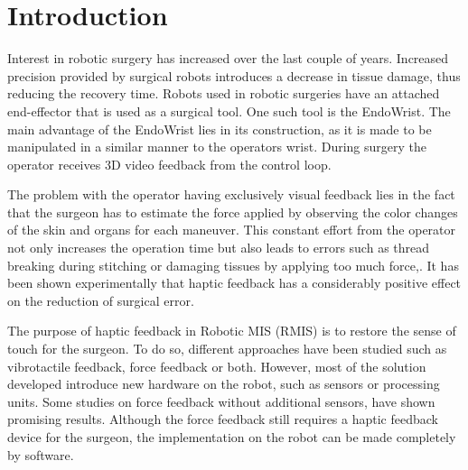 \section{Introduction}\label{sec:introduction}



Interest in robotic surgery has increased over the last couple of years. Increased precision provided by surgical robots introduces a decrease in tissue damage, thus reducing the recovery time\cite{RIGSP}.
Robots used in robotic surgeries have an attached end-effector that is used as a surgical tool.
One such tool is the EndoWrist.
The main advantage of the EndoWrist lies in its construction, as it is made to be manipulated in a similar manner to the operators wrist.
During surgery the operator receives 3D video feedback from the control loop. %

The problem with the operator having exclusively visual feedback lies in the fact that the surgeon has to estimate the force applied by observing the color changes of the skin and organs for each maneuver. This constant effort from the operator not only increases the operation time but also leads to errors such as thread breaking during stitching or damaging tissues by applying too much force,\cite{lee2015grip}. It has been shown experimentally that haptic feedback has a considerably positive effect on the reduction of surgical error\cite{EOFGFF}.

The purpose of haptic feedback in Robotic MIS (RMIS) is to restore the sense of touch for the surgeon. To do so, different approaches have been studied such as vibrotactile feedback\cite{tactile1}\cite{tactile2}, force feedback\cite{force_feedback_surgery} or both\cite{tactile3}. However, most of the solution developed introduce new hardware on the robot, such as sensors or processing units. Some studies on force feedback without additional sensors, have shown promising results\cite{tactile_summary}. Although the force feedback still requires a haptic feedback device for the surgeon, the implementation on the robot can be made completely by software.

